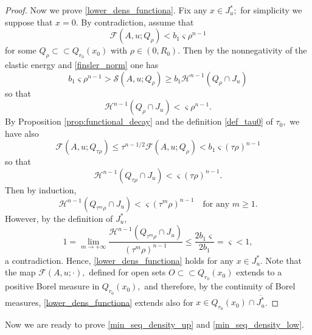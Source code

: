 \documentclass[reqno]{amsart}
\numberwithin{equation}{section}
\theoremstyle{plain}
\theoremstyle{definition}
\newcommand{\cH}{\mathcal{H}}
\newcommand{\cS}{\mathcal{S}}
\newcommand{\cF}{\mathcal{F}}
\newcommand{\bound}{b}
\newcommand{\strictlyincluded}{\subset\subset}
\newcommand{\openset}{O}
\begin{document}
\begin{proof}
Now we prove \eqref{lower_dens_functiona}. Fix any $x\in J_u^*;$ for simplicity we suppose that $x=0.$  By contradiction, assume that 
\begin{equation*} 
\cF(A,u;Q_\rho)<  \bound_1\varsigma \rho^{n-1}
\end{equation*}
for some $Q_\rho\strictlyincluded Q_{r_0}(x_0)$ with $\rho\in(0,R_0).$
%
Then by the nonnegativity of the elastic energy and 
\eqref{finsler_norm} one has
\begin{equation*} 
 \bound_1\varsigma \rho^{n-1} > \cS(A,u;Q_\rho) \ge \bound_1\cH^{n-1} (Q_\rho\cap J_u) 
\end{equation*}
%
so that 
\begin{equation*} 
\cH^{n-1} (Q_\rho\cap J_u)< \varsigma \rho^{n-1}.
\end{equation*}
%
By Proposition \ref{prop:functional_decay}  and the definition \eqref{def_tau0} of $\tau_0,$  we have also
$$
\cF(A,u;Q_{\tau \rho}) \le \tau^{n-1/2} \cF(A,u;Q_\rho) < \bound_1\varsigma (\tau\rho)^{n-1} 
$$
so that
$$
\cH^{n-1} (Q_{\tau\rho}\cap J_u)< \varsigma (\tau\rho)^{n-1}. 
$$
Then by induction,  
$$
\cH^{n-1} (Q_{\tau^m\rho}\cap J_u)< \varsigma (\tau^m\rho)^{n-1}  
\quad\text{for any $m\ge1.$}
$$
However, by the definition of $J_u^*,$
$$
1 = \lim\limits_{m\to+\infty} 
\frac{\cH^{n-1} (Q_{\tau^m\rho}\cap J_u)}{(\tau^m\rho)^{n-1}} 
\le \frac{2\bound_1\varsigma }{2\bound_1} = \varsigma<1, 
$$
a contradiction. Hence, \eqref{lower_dens_functiona} holds for any $x\in J_u^*.$  Note that the map $\cF(A,u;\cdot),$ defined for open sets $\openset\strictlyincluded Q_{r_0}(x_0)$ extends to a positive Borel measure in $Q_{r_0}(x_0),$ and therefore, by the continuity of Borel measures, \eqref{lower_dens_functiona} extends also for $x\in Q_{r_0}(x_0)\cap \overline{J_u^*}$.
\end{proof}

Now we are ready to prove \eqref{min_seq_density_up} and \eqref{min_seq_density_low}.
\end{document}
